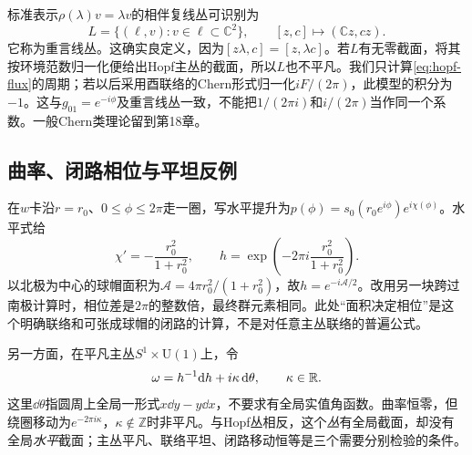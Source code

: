 标准表示$\rho(\lambda)v=\lambda v$的相伴复线丛可识别为
\[
 L=\{(\ell,v):v\in\ell\subset\mathbb C^2\},\qquad
 [z,c]\longmapsto(\mathbb Cz,cz).
\]
它称为重言线丛。这确实良定义，因为$[z\lambda,c]=[z,\lambda c]$。若$L$有无零截面，将其按环境范数归一化便给出Hopf主丛的截面，所以$L$也不平凡。我们只计算\eqref{eq:hopf-flux}的周期；若以后采用酉联络的Chern形式归一化$iF/(2\pi)$，此模型的积分为$-1$。这与$g_{01}=e^{-i\phi}$及重言线丛一致，不能把$1/(2\pi i)$和$i/(2\pi)$当作同一个系数。一般Chern类理论留到第18章。

\subsection{曲率、闭路相位与平坦反例}
在$w$卡沿$r=r_0$、$0\le\phi\le2\pi$走一圈，写水平提升为$p(\phi)=s_0(r_0e^{i\phi})e^{i\chi(\phi)}$。水平式给
\[
 \chi'=-\frac{r_0^2}{1+r_0^2},\qquad
 h=\exp\left(-2\pi i\frac{r_0^2}{1+r_0^2}\right).
\]
以北极为中心的球帽面积为$\mathcal A=4\pi r_0^2/(1+r_0^2)$，故$h=e^{-i\mathcal A/2}$。改用另一块跨过南极计算时，相位差是$2\pi$的整数倍，最终群元素相同。此处“面积决定相位”是这个明确联络和可张成球帽的闭路的计算，不是对任意主丛联络的普遍公式。

另一方面，在平凡主丛$S^1\times\mathrm U(1)$上，令
\[
 \omega=h^{-1}\mathrm{d} h+i\kappa\,\mathrm{d}\theta,\qquad\kappa\in\mathbb{R}.
\]
这里$\dd\theta$指圆周上全局一形式$x\dd y-y\dd x$，不要求有全局实值角函数。曲率恒零，但绕圈移动为$e^{-2\pi i\kappa}$，$\kappa\notin\mathbb Z$时非平凡。与Hopf丛相反，这个\emph{丛}有全局截面，却没有全局\emph{水平}截面；主丛平凡、联络平坦、闭路移动恒等是三个需要分别检验的条件。
